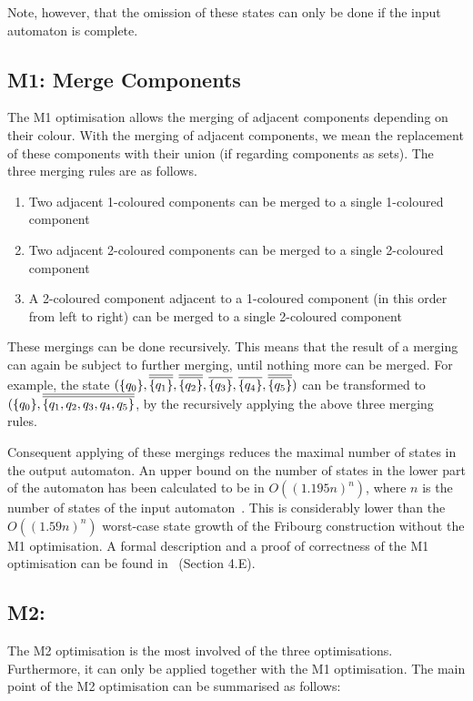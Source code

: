 Note, however, that the omission of these states can only be done if the input automaton is complete. 


\subsection{M1: Merge Components}
The M1 optimisation allows the merging of adjacent components depending on their colour. With the merging of adjacent components, we mean the replacement of these components with their union (if regarding components as sets). The three merging rules are as follows.

\begin{enumerate}
\item Two adjacent 1-coloured components can be merged to a single 1-coloured component
\item Two adjacent 2-coloured components can be merged to a single 2-coloured component
\item A 2-coloured component adjacent to a 1-coloured component (in this order from left to right) can be merged to a single 2-coloured component
\end{enumerate}

These mergings can be done recursively. This means that the result of a merging can again be subject to further merging, until nothing more can be merged. For example, the state $(\qm0, \cl2{\qm1}, \cl2{\qm2}, \cl1{\qm3}, \cl1{\qm4}, \cl2{\qm5})$ can be transformed to $(\qm0, \cl2{\{q_1, q_2, q_3, q_4, q_5\}}$, by the recursively applying the above three merging rules.

Consequent applying of these mergings reduces the maximal number of states in the output automaton. An upper bound on the number of states in the lower part of the automaton has been calculated to be in $O((1.195n)^n)$, where $n$ is the number of states of the input automaton~\cite{2014_joel_ulrich}. This is considerably lower than the $O((1.59n)^n)$ worst-case state growth of the Fribourg construction without the M1 optimisation. A formal description and a proof of correctness of the M1 optimisation can be found in~\cite{2014_joel_ulrich} (Section 4.E).


\subsection{M2:  }
The M2 optimisation is the most involved of the three optimisations. Furthermore, it can only be applied together with the M1 optimisation. The main point of the M2 optimisation can be summarised as follows:

